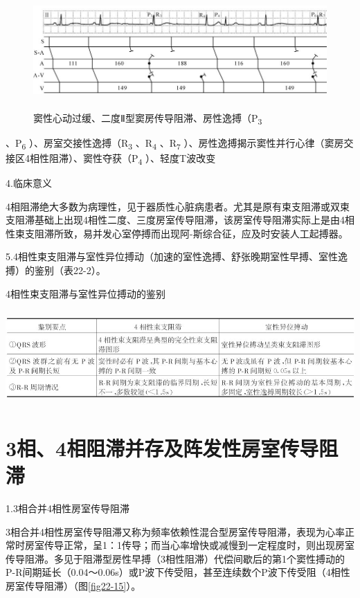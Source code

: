 \begin{figure}[!htbp]
 \centering
 \includegraphics[width=5.8125in,height=1.75in]{./images/Image00380.jpg}
 \captionsetup{justification=centering}
 \caption{窦性心动过缓、二度Ⅱ型窦房传导阻滞、房性逸搏（P\textsubscript{3}}
 \label{fig22-14}
  \end{figure} 
、P\textsubscript{6} ）、房室交接性逸搏（R\textsubscript{3}
、R\textsubscript{4} 、R\textsubscript{7}
）、房性逸搏揭示窦性并行心律（窦房交接区4相性阻滞）、窦性夺获（P\textsubscript{4}
）、轻度T波改变

4.临床意义

4相阻滞绝大多数为病理性，见于器质性心脏病患者。尤其是原有束支阻滞或双束支阻滞基础上出现4相性二度、三度房室传导阻滞，该房室传导阻滞实际上是由4相性束支阻滞所致，易并发心室停搏而出现阿-斯综合征，应及时安装人工起搏器。

5.4相性束支阻滞与室性异位搏动（加速的室性逸搏、舒张晚期室性早搏、室性逸搏）的鉴别（表22-2）。

\begin{table}[htbp]
\centering
\caption{4相性束支阻滞与室性异位搏动的鉴别}
\label{tab22-2}
\includegraphics[width=6.23958in,height=1.41667in]{./images/Image00381.jpg}
\end{table}

\protect\hypertarget{text00029.htmlux5cux23subid358}{}{}

\section{3相、4相阻滞并存及阵发性房室传导阻滞}

1.3相合并4相性房室传导阻滞

3相合并4相性房室传导阻滞又称为频率依赖性混合型房室传导阻滞，表现为心率正常时房室传导正常，呈1：1传导；而当心率增快或减慢到一定程度时，则出现房室传导阻滞。多见于阻滞型房性早搏（3相性阻滞）代偿间歇后的第1个窦性搏动的P-R间期延长（0.04～0.06s）或P波下传受阻，甚至连续数个P波下传受阻（4相性房室传导阻滞）（图\ref{fig22-15}）。


